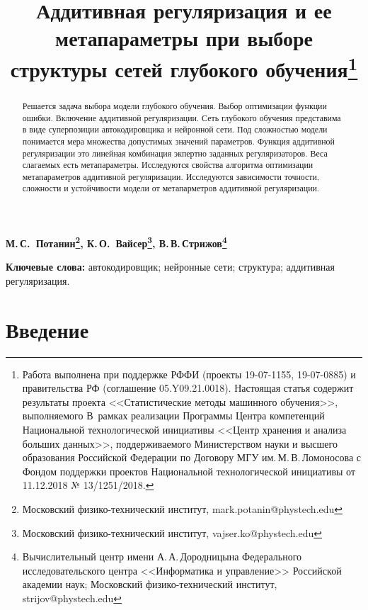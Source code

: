 \documentclass[12pt, twoside]{article}
\begin{document}
\title{\textbf{Аддитивная регуляризация и ее метапараметры при выборе структуры сетей глубокого обучения}\thanks{Работа выполнена при поддержке РФФИ (проекты 19-07-1155, 19-07-0885) и правительства РФ (соглашение 05.Y09.21.0018). Настоящая статья содержит результаты проекта <<Статистические методы машинного обучения>>, выполняемого В~рамках реализации Программы Центра компетенций Национальной технологической инициативы <<Центр хранения и анализа больших данных>>, поддерживаемого Министерством науки и высшего образования Российской Федерации по Договору МГУ им.\,М.\,В.\,Ломоносова  с Фондом поддержки проектов Национальной технологической инициативы от 11.12.2018 № 13/1251/2018.}}
\date{}
\maketitle

\begin{center}
\bf
М.\,С.~Потанин\footnote{Московский физико-технический институт, mark.potanin@phystech.edu}, К.\,О.~Вайсер\footnote{Московский физико-технический институт, vajser.ko@phystech.edu},  В.\,В.\,Стрижов\footnote{Вычислительный центр имени А.\,А.\,Дородницына Федерального исследовательского центра <<Информатика и управление>> Российской академии наук; Московский физико-технический институт, strijov@phystech.edu}
\end{center}

\begin{abstract}	
Решается задача выбора модели глубокого обучения. Выбор оптимизации функции ошибки. Включение аддитивной регуляризации. Сеть глубокого обучения представима в виде суперпозиции автокодировщика и нейронной сети. Под сложностью модели понимается мера множества допустимых значений параметров.
Функция аддитивной регуляризации это линейная комбинация экпертно заданных регуляризаторов. Веса слагаемых есть метапараметры. Исследуются свойства алгоритма оптимизации метапараметров аддитивной регуляризации.  Исследуются зависимости точности, сложности и устойчивости модели от метапарметров аддитивной регуляризации.
\end{abstract}

{\bf Ключевые слова:} автокодировщик; нейронные сети; структура; аддитивная регуляризация.

\setcounter{secnumdepth}{0}
\section{Введение}
\end{document}
